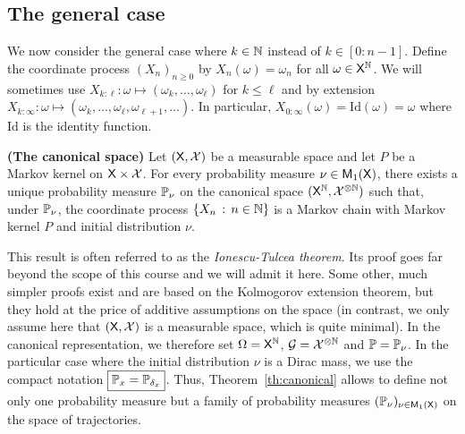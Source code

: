 \documentclass[english,graybox,envcountchap,envcountsame,sectrefs,shortlabels]{svmono}
\theoremstyle{style}
\newcommand{\bs}{\begin{shaded}}
\newcommand{\es}{\end{shaded}}
\begin{document}
\subsection{The general case }

We now consider the general case where $k\in\mathbb{N}$ instead of $k\in[0:n-1]$.
Define the coordinate process $(X_{n})_{n\geq 0}$ by $X_{n}(\omega)=\omega_{n}$
for all $\omega\in\mathsf{X}^{\mathbb{N}}$. We will sometimes use $X_{k:\ell}:\omega\mapsto(\omega_{k},\ldots,\omega_{\ell})$
for $k\leq\ell$ and by extension $X_{k:\infty}:\omega\mapsto(\omega_{k},\ldots,\omega_{\ell},\omega_{\ell+1},\dots)$.
In particular, $X_{0:\infty}(\omega)=\mathrm{Id}(\omega)=\omega$ where $\mathrm{Id}$
is the identity function.

\bs
\begin{theorem}
\label{th:canonical}
\textbf{(The canonical space)} Let $(\mathsf{X},\mathcal{X})$ be a measurable
space and let $P$ be a Markov kernel on $\mathsf{X}\times\mathcal{X}$. For
every probability measure $\nu\in\mathsf{M}_{1}(\mathsf{X})$, there exists a
unique probability measure $\mathbb{P}_{\nu}$ on the canonical space $(\mathsf{X}^{\mathbb{N}},\mathcal{X}^{\otimes\mathbb{N}})$
such that, under $\mathbb{P}_{\nu}$, the coordinate process $\left\{ X_{n}\,:\,n\in\mathbb{N}\right\}$
is a Markov chain with Markov kernel $P$ and initial distribution
$\nu$.
\end{theorem}
\es This result is often referred to as the \emph{Ionescu-Tulcea
theorem}. Its proof goes far beyond the scope of this course and we
will admit it here. Some other, much simpler proofs exist and are
based on the Kolmogorov extension theorem, but they hold at the price
of additive assumptions on the space (in contrast, we only assume
here that $(\mathsf{X},\mathcal{X})$ is a measurable space, which is quite
minimal). In the canonical representation, we therefore set $\Omega=\mathsf{X}^{\mathbb{N}}$,
$\mathcal{G}=\mathcal{X}^{\otimes\mathbb{N}}$ and $\mathbb{P}=\mathbb{P}_{\nu}$. In the particular
case where the initial distribution $\nu$ is a Dirac mass, we use
the compact notation $\boxed{\mathbb{P}_{x}=\mathbb{P}_{\delta_{x}}}$. Thus, Theorem~\ref{th:canonical} allows to define not only one probability measure but a family
of probability measures $(\mathbb{P}_{\nu})_{\nu\in\mathsf{M}_{1}(\mathsf{X})}$ on the
space of trajectories.
\end{document}
